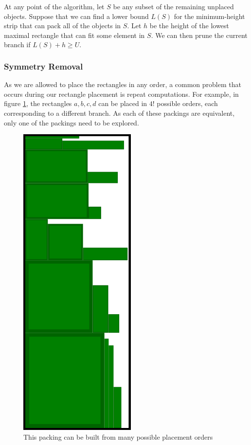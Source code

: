 \documentclass{article}
\begin{document}
\begin{defn}
\begin{defn}
\begin{dfn}
\begin{dfn}
At any point of the algorithm, let $S$ be any subset of the remaining unplaced objects. Suppose that we can find a lower bound $L(S)$ for the minimum-height strip that can pack all of the objects in $S$. Let $h$ be the height of the lowest maximal rectangle that can fit some element in $S$. We can then prune the current branch if $L(S) + h \geq U$.\\


\subsubsection{Symmetry Removal}
As we are allowed to place the rectangles in any order, a common problem that occurs during our rectangle placement is repeat computations. For example, in figure \ref{fig:repeatplacements}, the rectangles $a,b,c,d$ can be placed in $4!$ possible orders, each corresponding to a different branch. As each of these packings are equivalent, only one of the packings need to be explored.\\ 

\begin{figure}[!h]
  \centering
  \includegraphics[width=.5\linewidth]{FFDHrun.png}
  \caption{This packing can be built from many possible placement orders}
  \label{fig:repeatplacements}
\end{figure}


\end{dfn}
\end{dfn}
\end{defn}
\end{defn}
\end{document}
